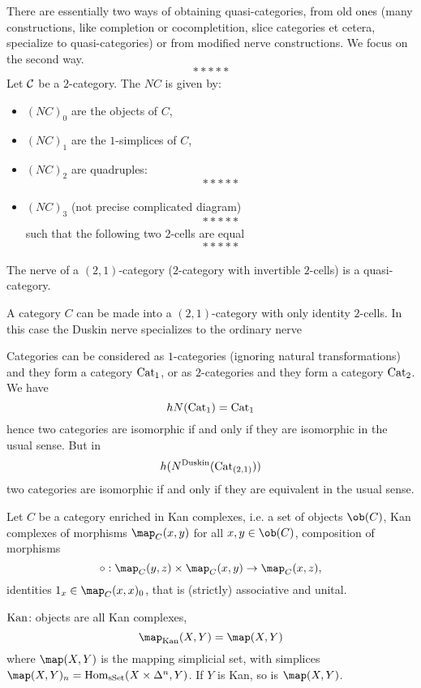 {\begin{example}
There are essentially two ways of obtaining quasi-categories, from old ones (many constructions, like completion or cocompletition, slice categories et cetera, specialize to quasi-categories) or from modified nerve constructions. We focus on the second way.
\[*****\]
Let $\mathcal{C}$ be a $2$-category. The  $NC$ is given by:
\begin{itemize}
    \item $(NC)_0$ are the objects of $C$,
    \item $(NC)_1$ are the $1$-simplices of $C$,
    \item $(NC)_2$ are quadruples:
    \[*****\]
    \item $(NC)_3$ (not precise complicated diagram)
    \[*****\]
    such that the following two $2$-cells are equal
    \[*****\]
\end{itemize}
\end{example}

\begin{theorem}
The nerve of a $(2,1)$-category ($2$-category with invertible $2$-cells) is a quasi-category.
\end{theorem}

\begin{remark}
A category $C$ can be made into a $(2,1)$-category with only identity $2$-cells. In this case the Duskin nerve specializes to the ordinary nerve
\end{remark}

\begin{example}
Categories can be considered as $1$-categories (ignoring natural transformations) and they form a category ${\mathrm{Cat}}_1$, or as $2$-categories and they form a category ${\mathrm{Cat}}_2$.
We have
\[hN({\mathrm{Cat}}_1)={\mathrm{Cat}}_1\]
hence two categories are isomorphic if and only if they are isomorphic in the usual sense.
But in
\[h(N^\text{Duskin}({\mathrm{Cat}}_{(2,1)}))\]
two categories are isomorphic if and only if they are equivalent in the usual sense.
\end{example}

Let $C$ be a category enriched in Kan complexes, i.e. a set of objects $\ob(C)$, Kan complexes of morphisms $\map_C(x,y)$ for all $x,y\in\ob(C)$, composition of morphisms
\[\circ:\map_C(y,z)\times\map_C(x,y)\to\map_C(x,z),\]
identities $1_x\in\map_C(x,x)_0$, that is (strictly) associative and unital.

\begin{example}
${\mathrm{Kan}}$: objects are all Kan complexes,
\[\map_\Kan(X,Y)=\map(X,Y)\]
where $\map(X,Y)$ is the mapping simplicial set, with simplices $\map(X,Y)_n=\Hom_\sSet(X\times\Delta^n,Y)$. If $Y$ is Kan, so is $\map(X,Y)$.
\end{example}

}
